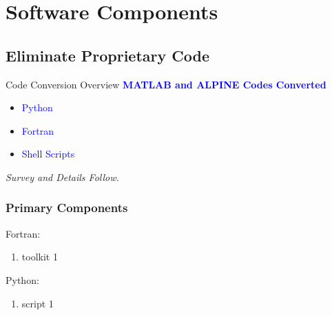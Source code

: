 % 
\renewcommand{\listingFontSize}{\tiny} 

\section{Software Components}

\subsection{Eliminate Proprietary Code}
\begin{frame}{Code Conversion Overview}
    \centering
    \textcolor{blue}{\textbf{MATLAB and ALPINE Codes Converted}} \\[1em]

    \begin{itemize}
        \item \textcolor{blue}{Python} \\
        \item \textcolor{blue}{Fortran} \\
        \item \textcolor{blue}{Shell Scripts}
    \end{itemize}

    \vspace{1em}
    \textit{Survey and Details Follow.}
\end{frame}
\begin{frame}\frametitle{Primary Components}
Fortran:
\begin{enumerate}
	\item toolkit 1
\end{enumerate}

Python:
\begin{enumerate}
	\item script 1
\end{enumerate}

\end{frame}

